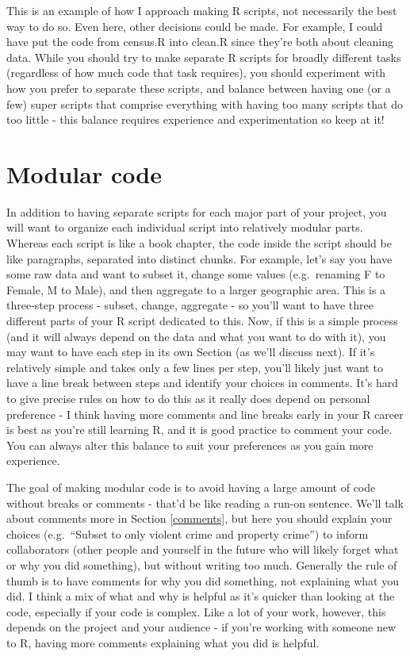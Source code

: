 \documentclass[
  a4paper,
]{krantz}
\begin{document}
This is an example of how I approach making R scripts, not
necessarily the best way to do so. Even here, other
decisions could be made. For example, I could have put the
code from census.R into clean.R since they're both about
cleaning data. While you should try to make separate R
scripts for broadly different tasks (regardless of how much
code that task requires), you should experiment with how you
prefer to separate these scripts, and balance between having
one (or a few) super scripts that comprise everything with
having too many scripts that do too little - this balance
requires experience and experimentation so keep at it!

\hypertarget{modular-code}{%
\section{Modular code}\label{modular-code}}

In addition to having separate scripts for each major part
of your project, you will want to organize each individual
script into relatively modular parts. Whereas each script is
like a book chapter, the code inside the script should be
like paragraphs, separated into distinct chunks. For
example, let's say you have some raw data and want to subset
it, change some values (e.g.~renaming F to Female, M to
Male), and then aggregate to a larger geographic area. This
is a three-step process - subset, change, aggregate - so
you'll want to have three different parts of your R script
dedicated to this. Now, if this is a simple process (and it
will always depend on the data and what you want to do with
it), you may want to have each step in its own Section (as
we'll discuss next). If it's relatively simple and takes
only a few lines per step, you'll likely just want to have a
line break between steps and identify your choices in
comments. It's hard to give precise rules on how to do this
as it really does depend on personal preference - I think
having more comments and line breaks early in your R career
is best as you're still learning R, and it is good practice
to comment your code. You can always alter this balance to
suit your preferences as you gain more experience.

The goal of making modular code is to avoid having a large
amount of code without breaks or comments - that'd be like
reading a run-on sentence. We'll talk about comments more in
Section \ref{comments}, but here you should explain your
choices (e.g.~``Subset to only violent crime and property
crime'') to inform collaborators (other people and yourself
in the future who will likely forget what or why you did
something), but without writing too much. Generally the rule
of thumb is to have comments for why you did something, not
explaining what you did. I think a mix of what and why is
helpful as it's quicker than looking at the code, especially
if your code is complex. Like a lot of your work, however,
this depends on the project and your audience - if you're
working with someone new to R, having more comments
explaining what you did is helpful.
\end{document}
